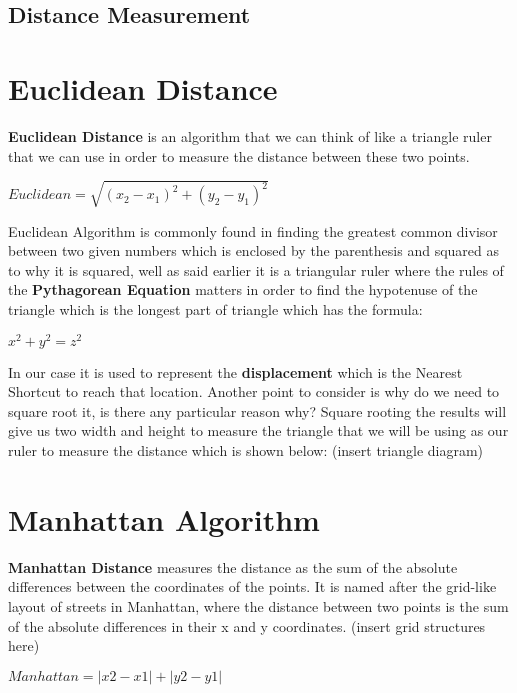 \documentclass[letterpaper, 12pt]{article}
\begin{document}
    \subsection*{Distance Measurement}
        \section*{Euclidean Distance} 
        \textbf{Euclidean Distance} is an algorithm that we can think of like a triangle ruler that we can use in order to measure the distance between these two points. 
        \begin{center}
            \begin{math}
               Euclidean = \sqrt{(x_2 - x_1)^2 + (y_2 - y_1)^2}
            \end{math}
        \end{center}
            \par Euclidean Algorithm is commonly found in finding the greatest common divisor between two given numbers which is enclosed by the parenthesis and squared as to why it is squared, well as said earlier it is a triangular ruler where the rules of the \textbf{Pythagorean Equation} matters in order to find the hypotenuse of the triangle which is the longest part of triangle which has the formula: 
            \begin{center}
                \begin{math}
                    x^2 + y^2 = z^2
                \end{math} 
            \end{center}
        In our case it is used to represent the \textbf{displacement} which is the Nearest Shortcut to reach that location. Another point to consider is why do we need to square root it, is there any particular reason why? Square rooting the results will give us two width and height to measure the triangle that we will be using as our ruler to measure the distance which is shown below: (insert triangle diagram)
    \section*{Manhattan Algorithm}
        \textbf{Manhattan Distance} measures the distance as the sum of the absolute differences between the coordinates of the points. It is named after the grid-like layout of streets in Manhattan, where the distance between two points is the sum of the absolute differences in their x and y coordinates. (insert grid structures here)
        \begin{center}
            \begin{math}
                Manhattan = |x2 - x1| + |y2 - y1|
            \end{math}
        \end{center}
    
\end{document}
